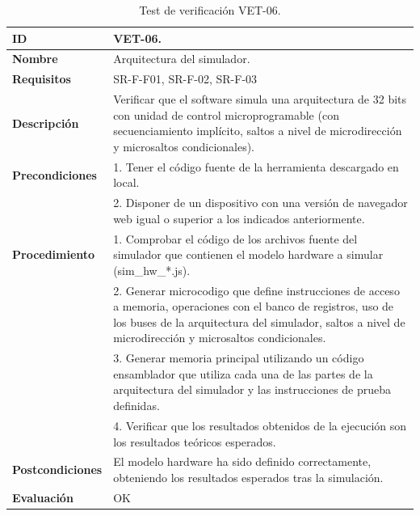 \begin{center}
\begin{table}[htbp]
\centering
\caption{Test de verificación VET-06.}
\begin{tabular}{@{}p{2.5cm} p{13cm}@{}} 
\toprule
\textbf{ID} 					& VET-06. \\
\midrule
\textbf{Nombre} 				& Arquitectura del simulador. \\
\midrule
\textbf{Requisitos} 		& SR-F-F01, SR-F-02, SR-F-03\\
\midrule
\textbf{Descripción} 		& Verificar que el \gls{software} simula una arquitectura de 32 bits con unidad de control microprogramable (con secuenciamiento implícito, saltos a nivel de microdirección y microsaltos condicionales). \\
\midrule
\textbf{Precondiciones}		& 1. Tener el código fuente de la herramienta descargado en local. \\
											& 2. Disponer de un dispositivo con una versión de navegador web igual o superior a los indicados anteriormente. \\
\midrule
\textbf{Procedimiento}		& 1. Comprobar el código de los archivos fuente del simulador que contienen el modelo \gls{hardware} a simular (sim\_hw\_*.js).\\
											& 2. Generar \gls{microcodigo} que define instrucciones de acceso a memoria, operaciones con el banco de registros, uso de los buses de la arquitectura del simulador, saltos a nivel de microdirección y microsaltos condicionales.\\
											& 3. Generar memoria principal utilizando un código \gls{ensamblador} que utiliza cada una de las partes de la arquitectura del simulador y las instrucciones de prueba definidas.\\
							& 4. Verificar que los resultados obtenidos de la ejecución son los resultados teóricos esperados.\\
\midrule
\textbf{Postcondiciones} 		&  El modelo \gls{hardware} ha sido definido correctamente, obteniendo los resultados esperados tras la simulación.\\
\midrule
\textbf{Evaluación} 			& OK \\
\bottomrule
\end{tabular}
\label{tab:vet06}
\end{table}
\end{center}

